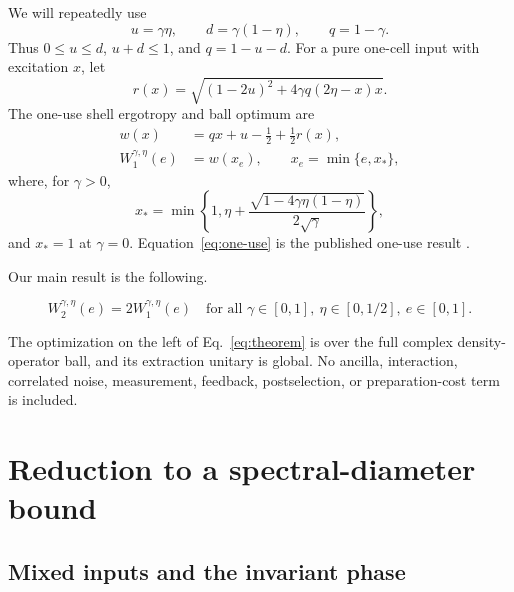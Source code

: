 \documentclass[pra,aps,twocolumn,nofootinbib,superscriptaddress]{revtex4-2}
\begin{document}
We will repeatedly use
\begin{equation}
 u=\gamma\eta,\qquad d=\gamma(1-\eta),\qquad q=1-\gamma.
\label{eq:udq}
\end{equation}
Thus $0\leq u\leq d$, $u+d\leq1$, and $q=1-u-d$.
For a pure one-cell input with excitation $x$, let
\begin{equation}
r(x)=\sqrt{(1-2u)^2+4\gamma q(2\eta-x)x}.
\label{eq:r}
\end{equation}
The one-use shell ergotropy and ball optimum are
\begin{align}
w(x)&=qx+u-\frac12+\frac12r(x),\\
W_1^{\gamma,\eta}(e)&=w(x_e),\qquad x_e=\min\{e,x_*\},
\label{eq:one-use}
\end{align}
where, for $\gamma>0$,
\begin{equation}
x_*=\min\!\left\{1,\eta+
 \frac{\sqrt{1-4\gamma\eta(1-\eta)}}{2\sqrt\gamma}\right\},
\label{eq:xstar}
\end{equation}
and $x_*=1$ at $\gamma=0$.  Equation~\eqref{eq:one-use} is the
published one-use result \cite{tirone2025}.

Our main result is the following.

\begin{widetext}
\begin{equation}
\boxed{\quad W_2^{\gamma,\eta}(e)=2W_1^{\gamma,\eta}(e)
\quad\text{for all }\gamma\in[0,1],\ \eta\in[0,1/2],\ e\in[0,1].\quad}
\label{eq:theorem}
\end{equation}
\end{widetext}
The optimization on the left of Eq.~\eqref{eq:theorem} is over the full
complex density-operator ball, and its extraction unitary is global.  No
ancilla, interaction, correlated noise, measurement, feedback, postselection,
or preparation-cost term is included.

\section{Reduction to a spectral-diameter bound}
\label{sec:reduction}

\subsection{Mixed inputs and the invariant phase}
\end{document}
